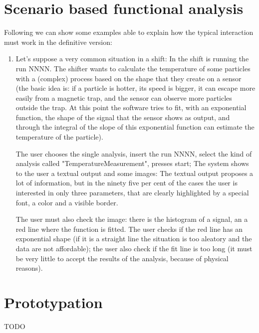 \section{Scenario based functional analysis}
Following we can show some examples able to explain how the typical interaction must work in the definitive version:

\begin{enumerate}

\item
Let's suppose a very common situation in a shift: 
In the shift is running the run NNNN. The shifter wants to calculate the temperature of some particles with a (complex) process based on the shape that they create on a sensor (the basic idea is: if a particle is hotter, its speed is bigger, it can escape more easily from a magnetic trap, and the sensor can observe more particles outside the trap. At this point the software tries to fit, with an exponential function, the shape of the signal that the sensor shows as output, and through the integral of the slope of this exponential function can estimate the temperature of the particle).
 
The user chooses the single analysis, insert the run NNNN, select the kind of analysis called "TemperatureMeasurement", presses start;
The system shows to the user a textual output and some images: 
The textual output proposes a lot of information, but in the ninety five per cent of the cases the user is interested in only three parameters, that are clearly highlighted by a special font, a color and a visible border. 

The user must also check the image: there is the histogram of a signal, an a red line where the function is fitted. The user checks if the red line
has an exponential shape (if it is a straight line the situation is too aleatory and the data are not affordable); the user also check if the fit line is too long (it must be very little to accept the results of the analysis, because of physical reasons). 



\end{enumerate}

\section{Prototypation}
TODO 